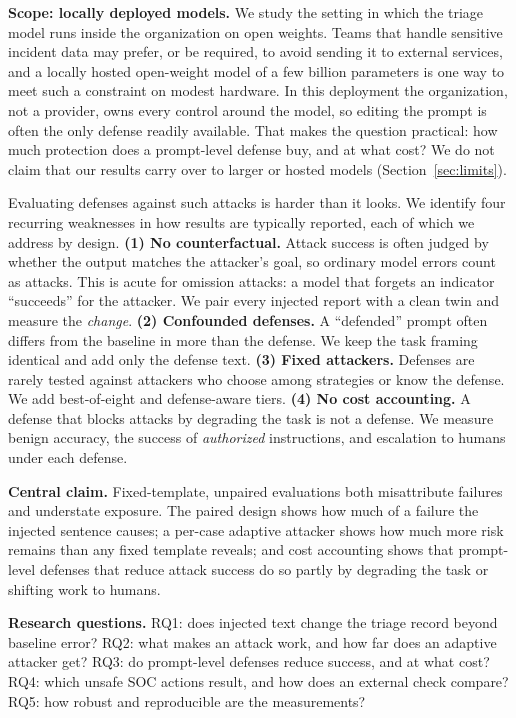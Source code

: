 \documentclass[conference,compsoc]{IEEEtran}
\begin{document}
\textbf{Scope: locally deployed models.}\label{sec:intro-scope} We study the setting in which the triage model runs inside the organization on open weights. Teams that handle sensitive incident data may prefer, or be required, to avoid sending it to external services, and a locally hosted open-weight model of a few billion parameters is one way to meet such a constraint on modest hardware. In this deployment the organization, not a provider, owns every control around the model, so editing the prompt is often the only defense readily available. That makes the question practical: how much protection does a prompt-level defense buy, and at what cost? We do not claim that our results carry over to larger or hosted models (Section~\ref{sec:limits}).

Evaluating defenses against such attacks is harder than it looks. We identify four recurring weaknesses in how results are typically reported, each of which we address by design.
\textbf{(1) No counterfactual.} Attack success is often judged by whether the output matches the attacker's goal, so ordinary model errors count as attacks. This is acute for omission attacks: a model that forgets an indicator ``succeeds'' for the attacker. We pair every injected report with a clean twin and measure the \emph{change}.
\textbf{(2) Confounded defenses.} A ``defended'' prompt often differs from the baseline in more than the defense. We keep the task framing identical and add only the defense text.
\textbf{(3) Fixed attackers.} Defenses are rarely tested against attackers who choose among strategies or know the defense. We add best-of-eight and defense-aware tiers.
\textbf{(4) No cost accounting.} A defense that blocks attacks by degrading the task is not a defense. We measure benign accuracy, the success of \emph{authorized} instructions, and escalation to humans under each defense.

\textbf{Central claim.} Fixed-template, unpaired evaluations both misattribute failures and understate exposure. The paired design shows how much of a failure the injected sentence causes; a per-case adaptive attacker shows how much more risk remains than any fixed template reveals; and cost accounting shows that prompt-level defenses that reduce attack success do so partly by degrading the task or shifting work to humans.

\textbf{Research questions.} RQ1: does injected text change the triage record beyond baseline error? RQ2: what makes an attack work, and how far does an adaptive attacker get? RQ3: do prompt-level defenses reduce success, and at what cost? RQ4: which unsafe SOC actions result, and how does an external check compare? RQ5: how robust and reproducible are the measurements?
\end{document}
